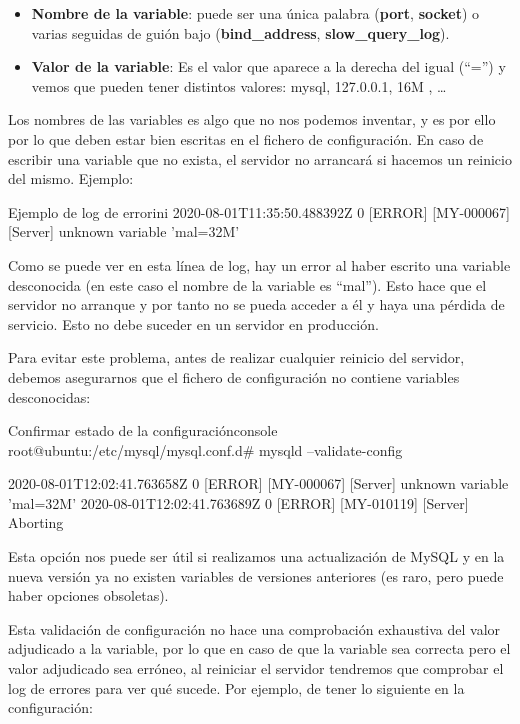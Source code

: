 \begin{itemize}
    \item \textbf{Nombre de la variable}: puede ser una única palabra (\textbf{port}, \textbf{socket}) o varias seguidas de guión bajo (\textbf{bind\_address}, \textbf{slow\_query\_log}).
    \item \textbf{Valor de la variable}: Es el valor que aparece a la derecha del igual (“=”) y vemos que pueden tener distintos valores: mysql, 127.0.0.1, 16M , …
\end{itemize}

Los nombres de las variables es algo que no nos podemos inventar, y es por ello por lo que deben estar bien escritas en el fichero de configuración. En caso de escribir una variable que no exista, el servidor no arrancará si hacemos un reinicio del mismo. Ejemplo:

\begin{mycode}{Ejemplo de log de error}{ini}{\footnotesize}
2020-08-01T11:35:50.488392Z 0 [ERROR] [MY-000067] [Server] unknown variable 'mal=32M'
\end{mycode}

Como se puede ver en esta línea de log, hay un error al haber escrito una variable desconocida (en este caso el nombre de la variable es “mal”). Esto hace que el servidor no arranque y por tanto no se pueda acceder a él y haya una pérdida de servicio. Esto no debe suceder en un servidor en producción.

Para evitar este problema, antes de realizar cualquier reinicio del servidor, debemos asegurarnos que el fichero de configuración no contiene variables desconocidas:

\begin{mycode}{Confirmar estado de la configuración}{console}{\footnotesize}
root@ubuntu:/etc/mysql/mysql.conf.d# mysqld --validate-config

2020-08-01T12:02:41.763658Z 0 [ERROR] [MY-000067] [Server] unknown variable 'mal=32M'
2020-08-01T12:02:41.763689Z 0 [ERROR] [MY-010119] [Server] Aborting
\end{mycode}


Esta opción nos puede ser útil si realizamos una actualización de MySQL y en la nueva versión ya no existen variables de versiones anteriores (es raro, pero puede haber opciones obsoletas).


Esta validación de configuración no hace una comprobación exhaustiva del valor adjudicado a la variable, por lo que en caso de que la variable sea correcta pero el valor adjudicado sea erróneo, al reiniciar el servidor tendremos que comprobar el log de errores para ver qué sucede. Por ejemplo, de tener lo siguiente en la configuración:

